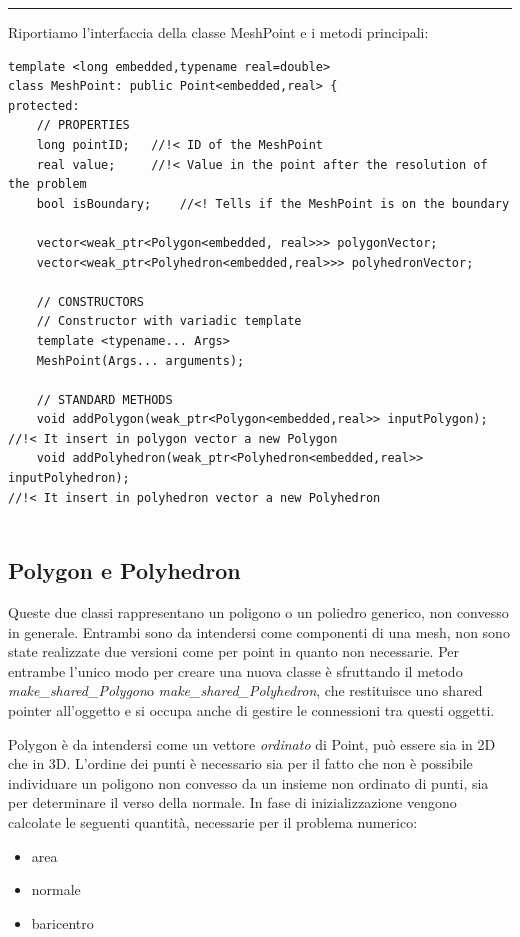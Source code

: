 \documentclass[oneside,12pt]{book}  %
\theoremstyle{plain}
\theoremstyle{definition}
\theoremstyle{remark}
\numberwithin{equation}{chapter} %
\begin{document}
\noindent\rule{14cm}{1pt}

Riportiamo l'interfaccia della classe MeshPoint e i metodi principali:

\begin{verbatim}
template <long embedded,typename real=double>
class MeshPoint: public Point<embedded,real> {
protected:
    // PROPERTIES
    long pointID;	//!< ID of the MeshPoint
    real value;		//!< Value in the point after the resolution of the problem
    bool isBoundary;	//<! Tells if the MeshPoint is on the boundary

    vector<weak_ptr<Polygon<embedded, real>>> polygonVector;
    vector<weak_ptr<Polyhedron<embedded,real>>> polyhedronVector;

    // CONSTRUCTORS
    // Constructor with variadic template
    template <typename... Args>
    MeshPoint(Args... arguments);

    // STANDARD METHODS
    void addPolygon(weak_ptr<Polygon<embedded,real>> inputPolygon); 
//!< It insert in polygon vector a new Polygon
    void addPolyhedron(weak_ptr<Polyhedron<embedded,real>> inputPolyhedron);	
//!< It insert in polyhedron vector a new Polyhedron


\end{verbatim}

\subsection{Polygon e Polyhedron}
Queste due classi rappresentano un poligono o un poliedro generico,
non convesso in generale. Entrambi sono da intendersi come componenti
di una mesh, non sono state realizzate due versioni come per point in
quanto non necessarie. Per entrambe l'unico modo per creare una nuova
classe \`e sfruttando il metodo \textit{make\_shared\_Polygon}o
\textit{make\_shared\_Polyhedron}, che restituisce uno shared pointer
all'oggetto e si occupa anche di gestire le connessioni tra questi
oggetti.

Polygon \`e da intendersi come un vettore \textit{ordinato} di Point,
pu\`o essere sia in 2D che in 3D. L'ordine dei punti \`e necessario
sia per il fatto che non \`e possibile individuare un poligono non
convesso da un insieme non ordinato di punti, sia per determinare il
verso della normale. In fase di inizializzazione vengono calcolate le
seguenti quantit\`a, necessarie per il problema numerico:
\begin{itemize}
\item area
\item normale
\item baricentro
\end{itemize}
\end{document}
